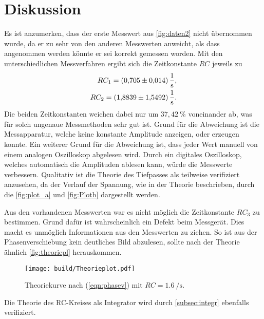 \section{Diskussion}
\label{sec:Diskussion}

Es ist anzumerken, dass der erste Messwert aus \autoref{fig:daten2} nicht übernommen wurde, da er zu sehr von den anderen Messwerten anweicht,
als dass angenommen werden könnte er sei korrekt gemessen worden.
Mit den unterschiedlichen Messverfahren ergibt sich die Zeitkonstante $RC$ jeweils zu 
\begin{align*}
    RC_1 = \SI{0.705 (0.014)}{\per\second}, \\
    RC_2 = \SI{1.8839 (1.5492)}{\per\second}. \\
\end{align*}
Die beiden Zeitkonstanten weichen dabei nur um $37,42 \:\%$ voneinander ab, was für solch ungenaue Messmethoden sehr gut ist.
Grund für die Abweichung ist die Messapparatur, welche keine konstante Amplitude anzeigen, oder erzeugen konnte.
Ein weiterer Grund für die Abweichung ist, dass jeder Wert manuell von einem analogen Oszilloskop abgelesen wird. Durch ein digitales 
Oszilloskop, welches automatisch die Amplituden ablesen kann, würde die Messwerte verbessern.
Qualitativ ist die Theorie des Tiefpasses als teilweise verifiziert anzusehen, da der Verlauf der Spannung, wie in der Theorie beschrieben,
durch die \autoref{fig:plot_a} und \autoref{fig:Plotb} dargestellt werden.

Aus den vorhandenen Messwerten war es nicht möglich die Zeitkonstante $RC_3$ zu bestimmen. Grund dafür ist wahrscheinlich ein Defekt
beim Messgerät. Dies macht es unmöglich Informationen aus den Messwerten zu ziehen. So ist aus der Phasenverschiebung kein deutliches Bild
abzulesen, sollte nach der Theorie ähnlich \autoref{fig:theoriepl} herauskommen.
\begin{figure}[H]
    \centering
    \texttt{[image: build/Theorieplot.pdf]}
    \caption{Theoriekurve nach (\ref{eqn:phasev}) mit $RC=\SI{1,6}{\per\second}$.}
    \label{fig:theoriepl}
\end{figure}

Die Theorie des RC-Kreises als Integrator wird durch \autoref{subsec:integr} ebenfalls verifiziert.